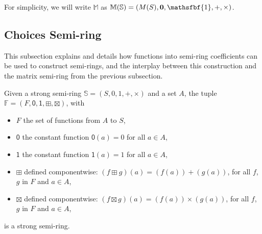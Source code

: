 \documentclass[runningheads]{llncs}
\renewcommand{\oplus}{+}
\renewcommand{\otimes}{\times}
\begin{document}
For simplicity, we will write \(\mathbb{M}\) as \(\mathbb{M} (\mathbb{S} ) = (M(S),\mathbf{0} ,\mathsfbf{1} ,\oplus ,\otimes )\).

\subsection{Choices Semi-ring}
\label{sec:app:choice}

This subsection explains and details how functions into semi-ring coefficients can be used to construct semi-rings, and the interplay between this construction and the matrix semi-ring from the previous subsection.

\begin{lemma}
	\label{lem:functions}
	Given a strong semi-ring \(\mathbb{S} = (S, 0, 1, +, \times )\) and a set \(A\), the tuple \(\mathbb{F} = (F, \mathsf{0} , \mathsf{1} , \boxplus , \boxtimes )\), with
	\begin{itemize}
		\item \(F\) the set of functions from \(A\) to \(S\),
		\item \(\mathsf{0} \) the constant function \(\mathsf{0} (a) = 0\) for all \(a \in A\),
		\item \(\mathsf{1} \) the constant function \(\mathsf{1} (a) = 1\) for all \(a \in A\),
		\item \(\boxplus \) defined componentwise: \((f \boxplus g)(a) = (f(a)) + (g(a))\), for all \(f\), \(g\) in \(F\) and \(a \in A\),
		\item \(\boxtimes \) defined componentwise: \((f \boxtimes g)(a) = (f(a)) \times (g(a))\), for all \(f\), \(g\) in \(F\) and \(a \in A\),
	\end{itemize}
	is a strong semi-ring.
\end{lemma}
\end{document}
